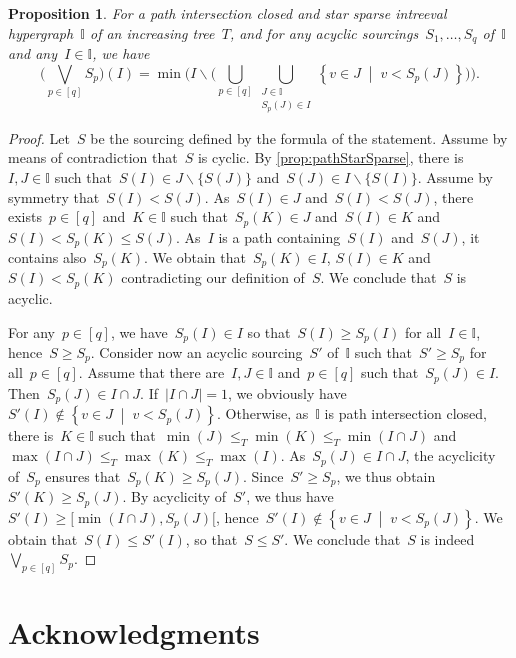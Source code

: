 \documentclass{amsart}
\newtheorem{proposition}[theorem]{Proposition}
\theoremstyle{definition}
\newcommand{\set}[2]{\left\{ #1 \;\middle|\; #2 \right\}} %
\newcommand{\ssm}{\smallsetminus} %
\newcommand{\bigJoin}{\bigvee} %
\newcommand{\II}{\mathbb I} %
\begin{document}
\begin{proposition}
\label{prop:expressionJoin}
For a path intersection closed and star sparse intreeval hypergraph~$\II$ of an increasing tree~$T$, and for any acyclic sourcings~$S_1, \dots, S_q$ of~$\II$ and any~$I \in \II$, we have
\[
\bigg( \bigJoin_{p \in [q]} S_p \bigg)(I) = \min \bigg( I \ssm \Big( \bigcup_{p \in [q]} \bigcup_{\substack{J \in \II \\ S_p(J) \in I}} \set{v \in J}{v < S_p(J)} \Big) \bigg).
\]
\end{proposition}

\begin{proof}
Let~$S$ be the sourcing defined by the formula of the statement.
Assume by means of contradiction that~$S$ is cyclic.
By \cref{prop:pathStarSparse}, there is~$I,J \in \II$ such that~$S(I) \in J \ssm \{S(J)\}$ and~$S(J) \in I \ssm \{S(I)\}$.
Assume by symmetry that~$S(I) < S(J)$.
As~$S(I) \in J$ and~$S(I) < S(J)$, there exists~$p \in [q]$ and~$K \in \II$ such that~$S_p(K) \in J$ and~$S(I) \in K$ and~$S(I) < S_p(K) \le S(J)$.
As~$I$ is a path containing~$S(I)$ and~$S(J)$, it contains also~$S_p(K)$.
We obtain that~$S_p(K) \in I$, $S(I) \in K$ and~$S(I) < S_p(K)$ contradicting our definition of~$S$.
We conclude that~$S$ is acyclic.

For any~$p \in [q]$, we have~$S_p(I) \in I$ so that~$S(I) \ge S_p(I)$ for all~$I \in \II$, hence~$S \ge S_p$.
Consider now an acyclic sourcing~$S'$ of~$\II$ such that~$S' \ge S_p$ for all~$p \in [q]$.
Assume that there are~$I,J \in \II$ and~$p \in [q]$ such that~$S_p(J) \in I$.
Then~$S_p(J) \in I \cap J$.
If~$|I \cap J| = 1$, we obviously have~$S'(I) \notin \set{v \in J}{v < S_p(J)}$.
Otherwise, as~$\II$ is path intersection closed, there is~$K \in \II$ such that~$\min(J) \le_T \min(K) \le_T \min(I \cap J)$ and~$\max(I \cap J) \le_T \max(K) \le_T \max(I)$.
As~$S_p(J) \in I \cap J$, the acyclicity of~$S_p$ ensures that~$S_p(K) \ge S_p(J)$.
Since~$S' \ge S_p$, we thus obtain~$S'(K) \ge S_p(J)$.
By acyclicity of~$S'$, we thus have~$S'(I) \ge [\min(I \cap J), S_p(J)[$, hence~$S'(I) \notin \set{v \in J}{v < S_p(J)}$.
We obtain that~$S(I) \le S'(I)$, so that~$S \le S'$.
We conclude that~$S$ is indeed~$\bigJoin_{p \in [q]} S_p$.
\end{proof}


\section*{Acknowledgments}
\end{document}
